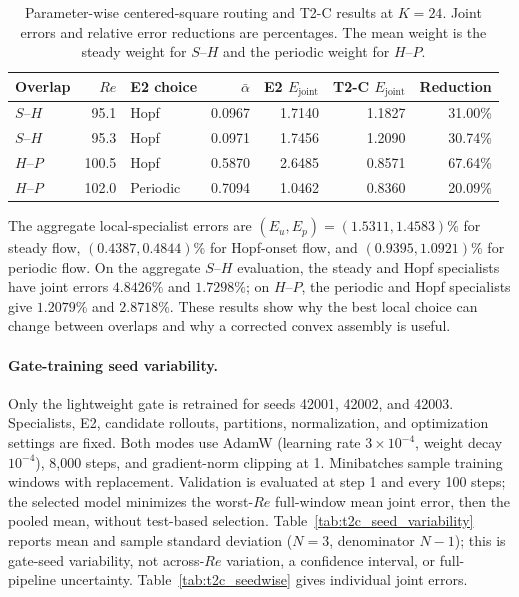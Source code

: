 \begin{table}[!htbp]
\centering
\caption{Parameter-wise centered-square routing and T2-C results at $K=24$.
Joint errors and relative error reductions are percentages. The mean weight
is the steady weight for $S$--$H$ and the periodic weight for $H$--$P$.}
\label{tab:square_parameter}
\small
\setlength{\tabcolsep}{3.5pt}
\begin{tabular}{lrlrrrr}
\toprule
Overlap & $Re$ & E2 choice & $\bar\alpha$ & E2 $E_{\mathrm{joint}}$ & T2-C $E_{\mathrm{joint}}$ & Reduction \\
\midrule
$S$--$H$ & 95.1 & Hopf & 0.0967 & 1.7140 & 1.1827 & 31.00\% \\
$S$--$H$ & 95.3 & Hopf & 0.0971 & 1.7456 & 1.2090 & 30.74\% \\
$H$--$P$ & 100.5 & Hopf & 0.5870 & 2.6485 & 0.8571 & 67.64\% \\
$H$--$P$ & 102.0 & Periodic & 0.7094 & 1.0462 & 0.8360 & 20.09\% \\
\bottomrule
\end{tabular}
\end{table}

The aggregate local-specialist errors are $(E_u,E_p)=(1.5311,1.4583)\%$ for steady flow, $(0.4387,0.4844)\%$ for Hopf-onset flow, and $(0.9395,1.0921)\%$ for periodic flow. On the aggregate $S$--$H$ evaluation, the steady and Hopf specialists have joint errors $4.8426\%$ and $1.7298\%$; on $H$--$P$, the periodic and Hopf specialists give $1.2079\%$ and $2.8718\%$. These results show why the best local choice can change between overlaps and why a corrected convex assembly is useful.

\FloatBarrier
\paragraph{Gate-training seed variability.}
Only the lightweight gate is retrained for seeds 42001, 42002, and 42003.
Specialists, E2, candidate rollouts, partitions, normalization, and optimization
settings are fixed. Both modes use AdamW (learning rate $3\times10^{-4}$,
weight decay $10^{-4}$), 8,000 steps, and gradient-norm clipping at 1.
Minibatches sample training windows with replacement. Validation is evaluated
at step 1 and every 100 steps; the selected model minimizes the worst-$Re$
full-window mean joint error, then the pooled mean, without test-based selection.
Table~\ref{tab:t2c_seed_variability} reports mean and sample standard deviation
($N=3$, denominator $N-1$); this is gate-seed variability, not across-$Re$
variation, a confidence interval, or full-pipeline uncertainty.
Table~\ref{tab:t2c_seedwise} gives individual joint errors.

